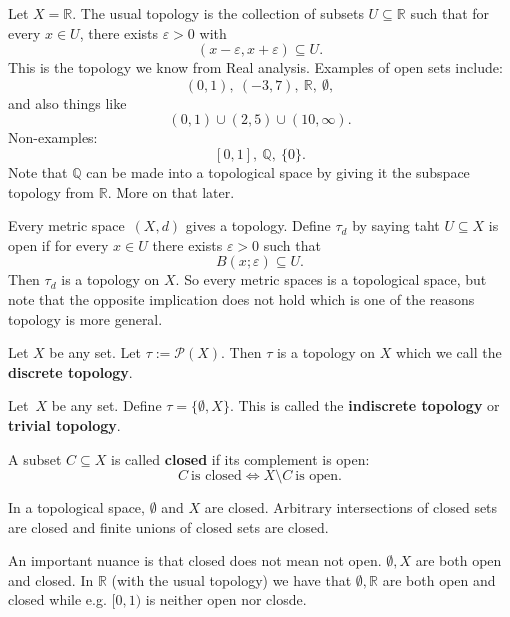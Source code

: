 \begin{ex}[$\mathbb R$]
    Let $X = \mathbb R$. The usual topology is the 
    collection of subsets $U \subseteq \mathbb R$ such 
    that for every $x \in U$, there exists $\varepsilon > 0$ with 
    \[
        (x - \varepsilon, x + \varepsilon) \subseteq U.
    \]
    This is the topology we know from Real analysis. 
    Examples of open sets include: 
    \[
        (0,1), \ (-3,7), \ \mathbb R, \ \emptyset, 
    \]
    and also things like 
    \[
        (0,1) \cup (2,5)\cup (10, \infty). 
    \]
    Non-examples: 
    \[
        [0,1], \ \mathbb Q, \ \{0\}. 
    \]
    Note that $\mathbb Q$ can be made into a topological space 
    by giving it the subspace topology from $\mathbb R$. 
    More on that later. 
\end{ex}
\begin{ex}
    Every metric space $(X,d)$ gives a topology. 
    Define $\tau_d$ by saying taht $U \subseteq X$ is open 
    if for every $x \in U$ there exists $\varepsilon > 0$ such that 
    \[
        B(x;\varepsilon) \subseteq U.
    \]
    Then $\tau_d$ is a topology on $X$. 
    So every metric spaces is a topological space, but 
    note that the opposite implication does not hold which 
    is one of the reasons topology is more general. 
\end{ex}
\begin{ex}
    Let $X$ be any set. Let $\tau := \mathcal P(X)$. 
    Then $\tau$ is a topology on $X$ which we call 
    the \textbf{discrete topology}. 
\end{ex}
\begin{ex}
    Let $X$ be any set. Define $\tau = \{\emptyset, X\}$. 
    This is called the \textbf{indiscrete topology} or 
    \textbf{trivial topology}.
\end{ex}

\begin{defn}
    A subset $C \subseteq X$ is called \textbf{closed} if its 
    complement is open: 
    \[
        C \ \text{is closed} \Leftrightarrow 
        X \setminus C \ \text{is open}.
    \]
\end{defn}

In a topological space, $\emptyset$ and $X$ are closed. 
Arbitrary intersections of closed sets are closed and 
finite unions of closed sets are closed. 

An important nuance is that closed does not mean not open. 
$\emptyset, X$ are both open and closed. In $\mathbb R$ (with the 
usual topology) we have that
$\emptyset, \mathbb R$ are both open and closed while e.g. 
$[0,1)$ is neither open nor closde. 

